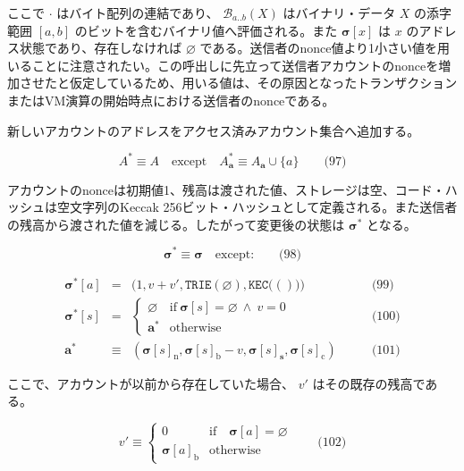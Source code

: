 \documentclass[
]{ltjsarticle}
\begin{document}
ここで \(\cdot\) はバイト配列の連結であり、 \(\mathcal{B}_{a..b}(X)\)
はバイナリ・データ \(X\) の添字範囲 \([a, b]\)
のビットを含むバイナリ値へ評価される。また \(\boldsymbol{\sigma}[x]\) は
\(x\) のアドレス状態であり、存在しなければ \(\varnothing\)
である。送信者のnonce値より1小さい値を用いることに注意されたい。この呼出しに先立って送信者アカウントのnonceを増加させたと仮定しているため、用いる値は、その原因となったトランザクションまたはVM演算の開始時点における送信者のnonceである。

新しいアカウントのアドレスをアクセス済みアカウント集合へ追加する。

\protect\hypertarget{eq-97}{}{}

\[A^{*} \equiv A \quad \text{except} \quad A^{*}_{\mathbf{a}} \equiv A_{\mathbf{a}} \cup \{a\} \qquad \text{(97)}\]

アカウントのnonceは初期値1、残高は渡された値、ストレージは空、コード・ハッシュは空文字列のKeccak
256ビット・ハッシュとして定義される。また送信者の残高から渡された値を減じる。したがって変更後の状態は
\(\boldsymbol{\sigma}^{*}\) となる。

\protect\hypertarget{eq-98}{}{}

\[\boldsymbol{\sigma}^{*} \equiv \boldsymbol{\sigma} \quad \text{except:} \qquad \text{(98)}\]

\protect\hypertarget{eq-99}{}{}\protect\hypertarget{eq-100}{}{}\protect\hypertarget{eq-101}{}{}

\[\begin{aligned}
\boldsymbol{\sigma}^{*}[a] &=& \big( 1, v + v', \mathtt{TRIE}(\varnothing), \mathtt{KEC}\big(()\big) \big) & \qquad \text{(99)} \\
\boldsymbol{\sigma}^{*}[s] &=& \begin{cases}
\varnothing & \text{if}\ \boldsymbol{\sigma}[s] = \varnothing \ \wedge\ v = 0 \\
\mathbf{a}^{*} & \text{otherwise}
\end{cases} & \qquad \text{(100)} \\
\mathbf{a}^{*} &\equiv& (\boldsymbol{\sigma}[s]_{\mathrm{n}}, \boldsymbol{\sigma}[s]_{\mathrm{b}} - v, \boldsymbol{\sigma}[s]_{\mathbf{s}}, \boldsymbol{\sigma}[s]_{\mathrm{c}}) & \qquad \text{(101)}
\end{aligned}\]

ここで、アカウントが以前から存在していた場合、 \(v'\)
はその既存の残高である。

\protect\hypertarget{eq-102}{}{}

\[v' \equiv \begin{cases}
0 & \text{if} \quad \boldsymbol{\sigma}[a] = \varnothing\\
\boldsymbol{\sigma}[a]_{\mathrm{b}} & \text{otherwise}
\end{cases} \qquad \text{(102)}\]
\end{document}
